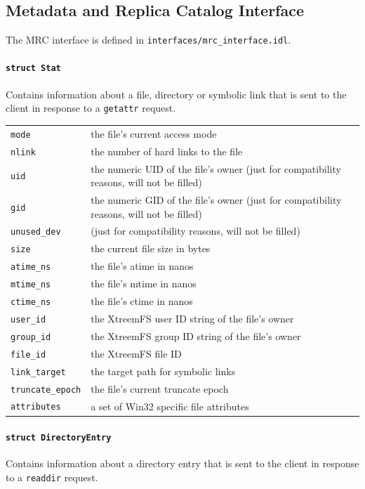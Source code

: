 \subsection{Metadata and Replica Catalog Interface}
\label{sec:mrc_interface}

The MRC interface is defined in \texttt{interfaces/mrc\_interface.idl}.

\paragraph{\texttt{struct Stat}}
Contains information about a file, directory or symbolic link that is sent to the client in response to a \texttt{getattr} request.

\begin{tabularx}{\textwidth}{lX}
 \texttt{mode} & the file's current access mode\\
 \texttt{nlink} & the number of hard links to the file\\
 \texttt{uid} & the numeric UID of the file's owner (just for compatibility reasons, will not be filled)\\
 \texttt{gid} & the numeric GID of the file's owner (just for compatibility reasons, will not be filled)\\
 \texttt{unused\_dev} & (just for compatibility reasons, will not be filled)\\
 \texttt{size} & the current file size in bytes\\
 \texttt{atime\_ns} & the file's atime in nanos\\
 \texttt{mtime\_ns} & the file's mtime in nanos\\
 \texttt{ctime\_ns} & the file's ctime in nanos\\
 \texttt{user\_id} & the XtreemFS user ID string of the file's owner\\
 \texttt{group\_id} & the XtreemFS group ID string of the file's owner\\
 \texttt{file\_id} & the XtreemFS file ID\\
 \texttt{link\_target} & the target path for symbolic links\\
 \texttt{truncate\_epoch} & the file's current truncate epoch\\
 \texttt{attributes} & a set of Win32 specific file attributes\\
\end{tabularx}

\paragraph{\texttt{struct DirectoryEntry}}
Contains information about a directory entry that is sent to the client in response to a \texttt{readdir} request.

